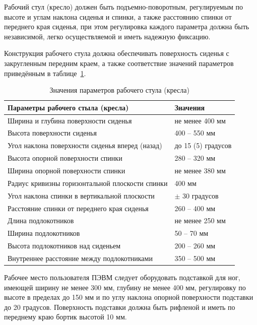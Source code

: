 Рабочий стул (кресло) должен быть подъемно-поворотным, регулируемым по высоте и углам наклона сиденья и спинки, а также расстоянию спинки от переднего края сиденья, при этом регулировка каждого параметра должна быть независимой, легко осуществляемой и иметь надежную фиксацию.

Конструкция рабочего стула должна обеспечивать поверхность сиденья с закругленным передним краем, а также соответствие значений параметров приведённым в таблице~\ref{bzd:workchair}.

\begin{table}[!htb]
	\caption{Значения параметров рабочего стула (кресла)}\label{bzd:workchair}
    \centering
    \begin{tabular}{|p{10cm}|p{6cm}|}
        \hline 
        \textbf{Параметры рабочего стыла (кресла)} & \textbf{Значения} \\ 
        \hline 
        Ширина и глубина поверхности сиденья & не менее 400 мм \\ 
        \hline 
        Высота поверхности сиденья & 400 – 550 мм \\ 
        \hline 
        Угол наклона поверхности сиденья вперед (назад) & до 15 (5) градусов \\ 
        \hline 
        Высота опорной поверхности спинки & 280 – 320 мм \\ 
        \hline 
        Ширина опорной поверхности спинки & не менее 380 мм \\ 
        \hline 
        Радиус кривизны горизонтальной плоскости спинки & 400 мм \\ 
        \hline 
        Угол наклона спинки в вертикальной плоскости & $\pm$ 30 градусов \\ 
        \hline 
        Расстояние спинки от переднего края сиденья & 260 – 400 мм \\ 
        \hline 
        Длина подлокотников & не менее 250 мм \\ 
        \hline 
        Ширина подлокотников & 50 – 70 мм \\ 
        \hline 
        Высота подлокотников над сиденьем & 200 – 260 мм \\ 
        \hline 
        Внутреннее расстояние между подлокотниками & 350 – 500 мм \\ 
        \hline 
        \end{tabular}     
    		
\end{table}

Рабочее место пользователя ПЭВМ следует оборудовать подставкой для ног, имеющей ширину не менее 300 мм, глубину не менее 400 мм, регулировку по высоте в пределах до 150 мм и по углу наклона опорной поверхности подставки до 20 градусов. Поверхность подставки должна быть рифленой и иметь по переднему краю бортик высотой 10 мм.

